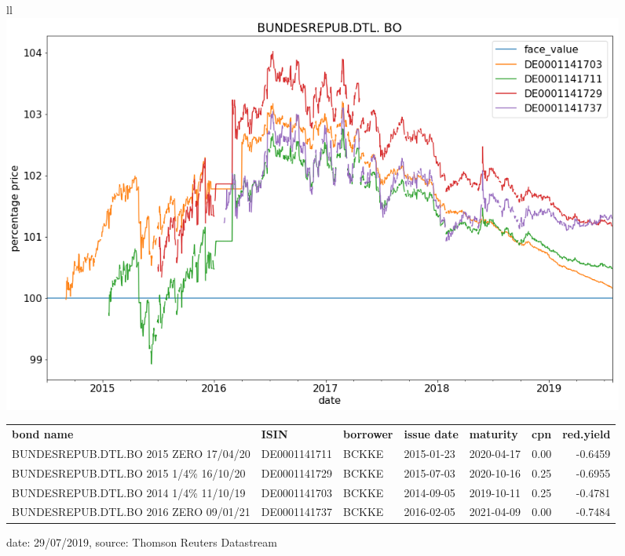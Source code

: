 \documentclass[10pt,a4paper]{article}
\begin{document}
	\begin{center}
		\begin{figure}
		\centering
		\begin{tabular}{ll}
		\includegraphics[width=.9\textwidth]{BUNDESREPUB_BO}
		\\
		\begin{tiny}
		\begin{tabular}{lllllrr}
		
			  \textbf{bond name} &          \textbf{ISIN} & \textbf{borrower} & \textbf{issue date} & \textbf{maturity} &  \textbf{cpn} &  \textbf{red.yield}  \\
		
		    	BUNDESREPUB.DTL.BO 2015 ZERO 17/04/20  &  DE0001141711 &         BCKKE & 2015-01-23 &           2020-04-17 &    0.00 &           -0.6459  \\
		     	BUNDESREPUB.DTL.BO 2015 1/4\% 16/10/20  &  DE0001141729 &         BCKKE & 2015-07-03 &           2020-10-16 &    0.25 &           -0.6955  \\ 
		      	BUNDESREPUB.DTL.BO 2014 1/4\% 11/10/19  &  DE0001141703 &         BCKKE & 2014-09-05 &           2019-10-11 &    0.25 &           -0.4781  \\ 
		       	BUNDESREPUB.DTL.BO 2016 ZERO 09/01/21 &  DE0001141737 &         BCKKE & 2016-02-05 &           2021-04-09 &    0.00 &           -0.7484  \\
			
		\end{tabular}
		\end{tiny}
		\end{tabular}
	\caption{{date: 29/07/2019, source: Thomson Reuters Datastream}}
	\label{fig.historicalBundPrices}
		\end{figure}	
\end{center}
	
\end{document}
